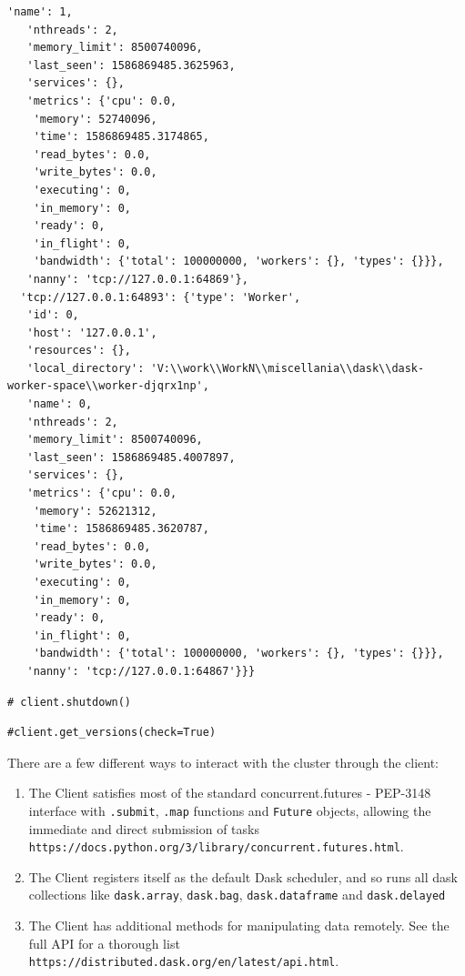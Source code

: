 \begin{lstlisting}[style=outcellstyle]
   'name': 1,
   'nthreads': 2,
   'memory_limit': 8500740096,
   'last_seen': 1586869485.3625963,
   'services': {},
   'metrics': {'cpu': 0.0,
    'memory': 52740096,
    'time': 1586869485.3174865,
    'read_bytes': 0.0,
    'write_bytes': 0.0,
    'executing': 0,
    'in_memory': 0,
    'ready': 0,
    'in_flight': 0,
    'bandwidth': {'total': 100000000, 'workers': {}, 'types': {}}},
   'nanny': 'tcp://127.0.0.1:64869'},
  'tcp://127.0.0.1:64893': {'type': 'Worker',
   'id': 0,
   'host': '127.0.0.1',
   'resources': {},
   'local_directory': 'V:\\work\\WorkN\\miscellania\\dask\\dask-worker-space\\worker-djqrx1np',
   'name': 0,
   'nthreads': 2,
   'memory_limit': 8500740096,
   'last_seen': 1586869485.4007897,
   'services': {},
   'metrics': {'cpu': 0.0,
    'memory': 52621312,
    'time': 1586869485.3620787,
    'read_bytes': 0.0,
    'write_bytes': 0.0,
    'executing': 0,
    'in_memory': 0,
    'ready': 0,
    'in_flight': 0,
    'bandwidth': {'total': 100000000, 'workers': {}, 'types': {}}},
   'nanny': 'tcp://127.0.0.1:64867'}}}
\end{lstlisting}


\begin{lstlisting}[style=incellstyle]
# client.shutdown()
\end{lstlisting}


\begin{lstlisting}[style=incellstyle]
#client.get_versions(check=True)
\end{lstlisting}

There are a few different ways to interact with the cluster through the client:


\begin{enumerate}
\item The Client satisfies most of the standard concurrent.futures - PEP-3148 interface with \verb+.submit+, \verb+.map+ functions and \verb+Future+ objects, allowing the immediate and direct submission of tasks \lstinline{https://docs.python.org/3/library/concurrent.futures.html}.
\item The Client registers itself as the default Dask scheduler, and so runs all dask collections like \verb+dask.array+, \verb+dask.bag+, \verb+dask.dataframe+ and \verb+dask.delayed+
\item The Client has additional methods for manipulating data remotely. See the full API for a thorough list \lstinline{https://distributed.dask.org/en/latest/api.html}.
\end{enumerate}



